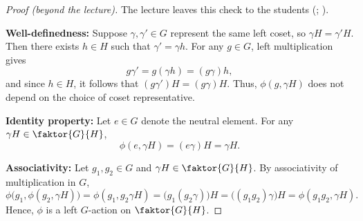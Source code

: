 \begin{content}

\begin{proof}[Proof (beyond the lecture)]
The lecture leaves this check to the students (; ).

\textbf{Well-definedness:} Suppose $\gamma, \gamma' \in G$ represent the same left coset, so $\gamma H = \gamma' H$. Then there exists $h \in H$ such that $\gamma' = \gamma h$. For any $g \in G$, left multiplication gives
\[
g\gamma' = g(\gamma h) = (g\gamma)h,
\]
and since $h \in H$, it follows that $(g\gamma') H = (g\gamma) H$. Thus, $\phi(g, \gamma H)$ does not depend on the choice of coset representative.

\textbf{Identity property:} Let $e \in G$ denote the neutral element. For any $\gamma H \in \faktor{G}{H}$,
\[
\phi(e, \gamma H) = (e\gamma) H = \gamma H.
\]

\textbf{Associativity:} Let $g_1, g_2 \in G$ and $\gamma H \in \faktor{G}{H}$. By associativity of multiplication in $G$,
\[
\phi\bigl(g_1, \phi(g_2, \gamma H)\bigr) = \phi(g_1, g_2\gamma H) = \bigl(g_1(g_2\gamma)\bigr)H = \bigl((g_1 g_2)\gamma\bigr)H = \phi(g_1 g_2, \gamma H).
\]
Hence, $\phi$ is a left $G$-action on $\faktor{G}{H}$.
\end{proof}
\end{content}


